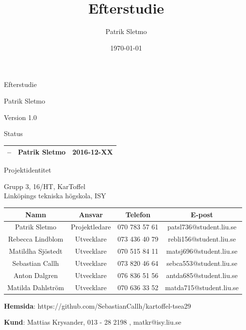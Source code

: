 \documentclass{article}
\title{Efterstudie}
\author{Patrik Sletmo}
\date{\today}
\begin{document}
\thispagestyle{empty}

{
\sffamily
\centering
\large


{\huge 
Efterstudie
}

{\large
Patrik Sletmo
}

{\large
Version 1.0
}

\vspace{3.5cm}

Status
\begin{table}[H]
\centering
\begin{tabular}{ | c | c | c | }
\hline
-- & Patrik Sletmo & 2016-12-XX \\
\hline
\end{tabular}
\end{table}
}
\clearpage

\vspace*{\fill}
{
\sffamily
\centering
\large


{\huge
Projektidentitet
}

{\large
Grupp 3, 16/HT, KarToffel \\ Linköpings tekniska högskola, ISY
}

\vspace{0.5cm}

\begin{table}[H]
\centering
\begin{tabular}{ | c | c | c | c |}
\hline
Namn & Ansvar & Telefon & E-post \\
\hline
Patrik Sletmo & Projektledare & 070 783 57 61 & patsl736@student.liu.se \\
\hline
Rebecca Lindblom & Utvecklare & 073 436 40 79 & rebli156@student.liu.se \\
\hline
Matildha Sjöstedt & Utvecklare & 070 515 84 11 & matsj696@student.liu.se \\
\hline
Sebastian Callh & Utvecklare & 073 820 46 64 & sebca553@student.liu.se \\
\hline
Anton Dalgren & Utvecklare & 076 836 51 56 & antda685@student.liu.se \\
\hline
Matilda Dahlström & Utvecklare & 070 636 33 52 & matda715@student.liu.se \\
\hline
\end{tabular}
\end{table}
}

\begin{center}
\textbf{Hemsida}: https://github.com/SebastianCallh/kartoffel-tsea29
\end{center}

\begin{center}
\textbf{Kund}: Mattias Krysander, 013 - 28 2198 , matkr@isy.liu.se
\end{center}
\end{document}
